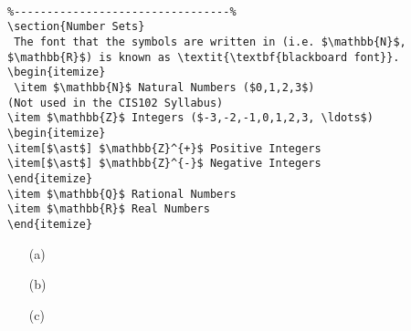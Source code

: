 \documentclass[MASTER.tex]{subfiles}
\begin{document}
\begin{verbatim}

%---------------------------------%
\section{Number Sets}
 The font that the symbols are written in (i.e. $\mathbb{N}$, $\mathbb{R}$) is known as \textit{\textbf{blackboard font}}.
\begin{itemize}
 \item $\mathbb{N}$ Natural Numbers ($0,1,2,3$) 
(Not used in the CIS102 Syllabus)
\item $\mathbb{Z}$ Integers ($-3,-2,-1,0,1,2,3, \ldots$)
\begin{itemize}
\item[$\ast$] $\mathbb{Z}^{+}$ Positive Integers
\item[$\ast$] $\mathbb{Z}^{-}$ Negative Integers
\end{itemize}
\item $\mathbb{Q}$ Rational Numbers
\item $\mathbb{R}$ Real Numbers
\end{itemize}
\end{verbatim}
\begin{itemize}

\item[(a)] 

\item[(b)]

\item[(c)]

\end{itemize}
\end{document}
